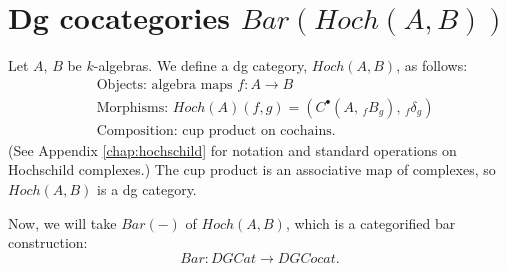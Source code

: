 \section{Dg cocategories $Bar(Hoch(A,B))$}
Let $A$, $B$ be $k$-algebras. We define 
a dg category, $Hoch(A,B)$, as follows:
\begin{align*}
	&\textrm{Objects: algebra maps } f:A \to B\\
	&\textrm{Morphisms: } 
	  Hoch(A)(f,g) = (C^\bullet(A,\, _fB_g),\, _f\delta_g)\\
	&\textrm{Composition: cup product on cochains.}
\end{align*}
(See Appendix \ref{chap:hochschild} for notation and 
standard operations on Hochschild complexes.) 
The cup product is an associative map of complexes, 
so $Hoch(A,B)$ is a dg category.

Now, we will take $Bar(-)$ of $Hoch(A,B)$, which 
is a categorified bar construction:
$$Bar: DGCat \to DGCocat.$$